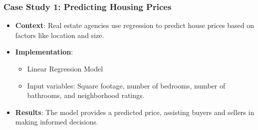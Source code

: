 \documentclass[aspectratio=169]{beamer}
\begin{document}
\begin{frame}[fragile]
    \frametitle{Case Study 1: Predicting Housing Prices}
    \begin{itemize}
        \item \textbf{Context}: Real estate agencies use regression to predict house prices based on factors like location and size.
        \item \textbf{Implementation}:
        \begin{itemize}
            \item Linear Regression Model
            \item Input variables: Square footage, number of bedrooms, number of bathrooms, and neighborhood ratings.
        \end{itemize}
        \item \textbf{Results}: The model provides a predicted price, assisting buyers and sellers in making informed decisions.
    \end{itemize}
\end{frame}
\end{document}
